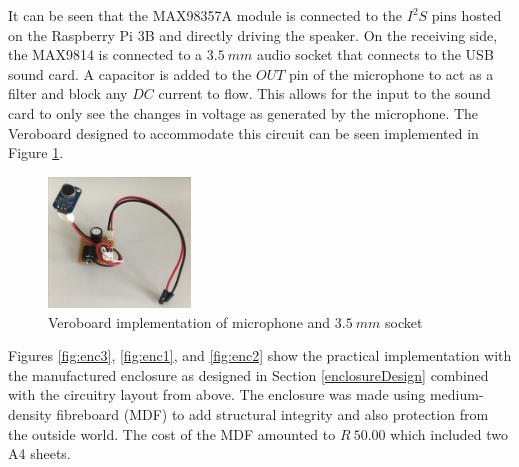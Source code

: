 It can be seen that the MAX98357A module is connected to the $I^2S$ pins hosted on the Raspberry Pi 3B and directly driving the speaker. On the receiving side, the MAX9814 is connected to a $3.5\ mm$ audio socket that connects to the USB sound card. A capacitor is added to the $OUT$ pin of the microphone to act as a filter and block any $DC$ current to flow. This allows for the input to the sound card to only see the changes in voltage as generated by the microphone. The Veroboard designed to accommodate this circuit can be seen implemented in Figure \ref{fig:veroboard}.

\begin{figure}[h!]
    \centering
    \includegraphics[width = 0.3375\textwidth]{images/veroboard.pdf}
    \caption{Veroboard implementation of microphone and $3.5\ mm$ socket}\label{fig:veroboard}
\end{figure}

Figures \ref{fig:enc3}, \ref{fig:enc1}, and \ref{fig:enc2} show the practical implementation with the manufactured enclosure as designed in Section \ref{enclosureDesign} combined with the circuitry layout from above. The enclosure was made using medium-density fibreboard (MDF) to add structural integrity and also protection from the outside world. The cost of the MDF amounted to $R\ 50.00$ which included two A4 sheets. 

